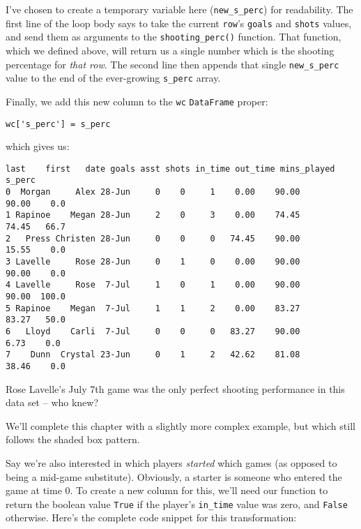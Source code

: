 I've chosen to create a temporary variable here (\texttt{new\_s\_perc}) for
readability. The first line of the loop body says to take the current
\texttt{row}'s \texttt{goals} and \texttt{shots} values, and send them as
arguments to the \texttt{shooting\_perc()} function. That function, which we
defined above, will return us a single number which is the shooting percentage
for \textit{that row}. The second line then appends that single
\texttt{new\_s\_perc} value to the end of the ever-growing \texttt{s\_perc}
array.

Finally, we add this new column to the \texttt{wc} \texttt{DataFrame} proper:

\begin{Verbatim}[fontsize=\small,samepage=true,frame=single,framesep=3mm]
wc['s_perc'] = s_perc
\end{Verbatim}

which gives us:

\begin{Verbatim}[fontsize=\footnotesize,samepage=true,frame=leftline,framesep=5mm,framerule=1mm]
     last    first   date goals asst shots in_time out_time mins_played s_perc
0  Morgan     Alex 28-Jun     0    0     1    0.00    90.00       90.00    0.0
1 Rapinoe    Megan 28-Jun     2    0     3    0.00    74.45       74.45   66.7
2   Press Christen 28-Jun     0    0     0   74.45    90.00       15.55    0.0
3 Lavelle     Rose 28-Jun     0    1     0    0.00    90.00       90.00    0.0
4 Lavelle     Rose  7-Jul     1    0     1    0.00    90.00       90.00  100.0
5 Rapinoe    Megan  7-Jul     1    1     2    0.00    83.27       83.27   50.0
6   Lloyd    Carli  7-Jul     0    0     0   83.27    90.00        6.73    0.0
7    Dunn  Crystal 23-Jun     0    1     2   42.62    81.08       38.46    0.0
\end{Verbatim}

Rose Lavelle's July 7th game was the only perfect shooting performance in this
data set -- who knew?

\bigskip

We'll complete this chapter with a slightly more complex example, but which
still follows the shaded box pattern.

Say we're also interested in which players \textit{started} which games (as
opposed to being a mid-game substitute). Obviously, a starter is someone who
entered the game at time 0. To create a new column for this, we'll need our
function to return the boolean value \texttt{True} if the player's
\texttt{in\_time} value was zero, and \texttt{False} otherwise. Here's
the complete code snippet for this transformation:

